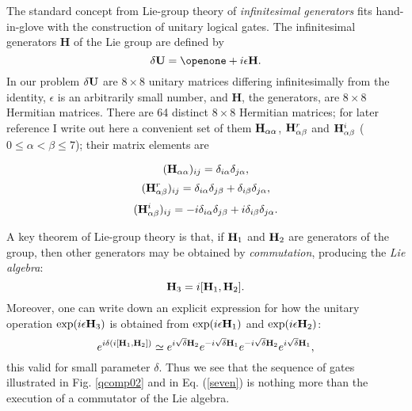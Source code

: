 The standard concept from Lie-group theory of {\em infinitesimal generators}
fits hand-in-glove with the construction of unitary logical gates.  The
infinitesimal generators {\bf H} of the Lie group are defined by
\begin{equation}
\delta {\bf U}={\bf \openone}+i\epsilon{\bf H}.\label{eight}
\end{equation}
In our problem $\delta {\bf U}$ are $8\times 8$ unitary matrices differing
infinitesimally from the identity, $\epsilon$ is an arbitrarily small
number, and {\bf H}, the generators, are $8\times 8$ Hermitian matrices.
There are 64 distinct $8\times 8$ Hermitian matrices; for later reference
I write out here a convenient set of them ${\bf H}_{\alpha\alpha}$,
${\bf H}^r_{\alpha\beta}$ and ${\bf H}^i_{\alpha\beta}$ ($0\leq\alpha<\beta
\leq 7$); their matrix elements are
\begin{mathletters}
\label{generallabel}
\begin{equation}
({\bf H}_{\alpha\alpha})_{ij}=\delta_{i\alpha}\delta_{j\alpha},\label{math1}
\end{equation}
\begin{equation}
({\bf H}^r_{\alpha\beta})_{ij}=\delta_{i\alpha}\delta_{j\beta}
+\delta_{i\beta}\delta_{j\alpha},\label{math2}
\end{equation}
\begin{equation}
({\bf H}^i_{\alpha\beta})_{ij}=-i\delta_{i\alpha}\delta_{j\beta}
+i\delta_{i\beta}\delta_{j\alpha}.\label{math3}
\end{equation}
\end{mathletters}
A key theorem of Lie-group theory is that, if ${\bf H}_1$ and ${\bf H}_2$
are generators of the group, then other generators may be obtained by
{\em commutation}, producing the {\em Lie algebra}:
\begin{equation}
{\bf H}_3=i[{\bf H}_1,{\bf H}_2].\label{comm}
\end{equation}
Moreover, one can write down an explicit expression for how the unitary
operation $\exp(i\epsilon{\bf H}_3)$ is obtained from
$\exp(i\epsilon{\bf H}_1)$ and $\exp(i\epsilon{\bf H}_2)$:
\begin{equation}
e^{i\delta(i[{\bf H}_1,{\bf H}_2])}\simeq e^{i\sqrt\delta{\bf H}_2}
e^{-i\sqrt\delta{\bf H}_1}e^{-i\sqrt\delta{\bf H}_2}e^{i\sqrt\delta{\bf H}_1},
\label{crux}
\end{equation}
this valid for small parameter $\delta$.  Thus we see that the sequence
of gates illustrated in Fig. \ref{qcomp02}
and in Eq. (\ref{seven}) is nothing more than the
execution of a commutator of the Lie algebra.

